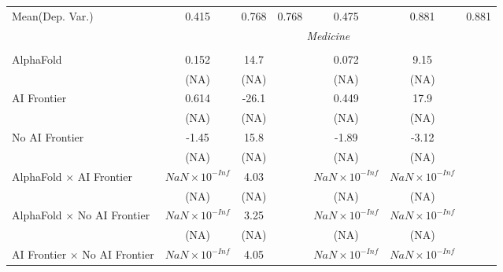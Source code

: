 \begin{tabular}{lcccccc}
Mean(Dep. Var.) & 0.415 & 0.768 & 0.768 & 0.475 & 0.881 & 0.881 \\
 & \multicolumn{6}{c}{\textit{Medicine}} \\ \\
   AlphaFold                                                                  & 0.152                  & 14.7  &        & 0.072                  & 9.15                   &   \\   
                                                                              & (NA)                   & (NA)  &        & (NA)                   & (NA)                   &   \\   
   AI Frontier                                                                & 0.614                  & -26.1 &        & 0.449                  & 17.9                   &   \\   
                                                                              & (NA)                   & (NA)  &        & (NA)                   & (NA)                   &   \\   
   No AI Frontier                                                             & -1.45                  & 15.8  &        & -1.89                  & -3.12                  &   \\   
                                                                              & (NA)                   & (NA)  &        & (NA)                   & (NA)                   &   \\   
   AlphaFold $\times$ AI Frontier                                             & $NaN\times 10^{-Inf}$  & 4.03  &        & $NaN\times 10^{-Inf}$  & $NaN\times 10^{-Inf}$  &   \\   
                                                                              & (NA)                   & (NA)  &        & (NA)                   & (NA)                   &   \\   
   AlphaFold $\times$ No AI Frontier                                          & $NaN\times 10^{-Inf}$  & 3.25  &        & $NaN\times 10^{-Inf}$  & $NaN\times 10^{-Inf}$  &   \\   
                                                                              & (NA)                   & (NA)  &        & (NA)                   & (NA)                   &   \\   
   AI Frontier $\times$ No AI Frontier                                        & $NaN\times 10^{-Inf}$  & 4.05  &        & $NaN\times 10^{-Inf}$  & $NaN\times 10^{-Inf}$  &   \\   

\end{tabular}
